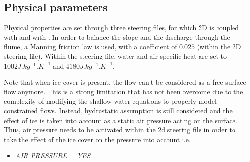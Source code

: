 \subsection{Physical parameters}
%
Physical properties are set through three steering files, for which \telemac2D is coupled with \waqtel and with \khione.
In order to balance the slope and the discharge through the flume, a Manning friction law is used, with a coefficient of $0.025$ (within the \telemac2D steering file). Within the \waqtel steering file, water and air specific heat are set to $1002J.kg^{-1}.K^{-1}$ and $4180 J.kg^{-1}.K^{-1}$.

Note that when ice cover is present, the flow can't be considered as a free surface flow anymore. 
This is a strong limitation that has not been overcome due to the complexity of modifying the shallow water equations to properly model constrained flows. Instead, hydrostatic assumption is still considered
and the effect of ice is taken into account as a static air pressure acting on the surface.
Thus, air pressure needs to be activated within the \telemac2d steering file in order to take the effect
of the ice cover on the pressure into account i.e.
\begin{itemize}
    \item\textit{AIR PRESSURE = YES}
\end{itemize}


